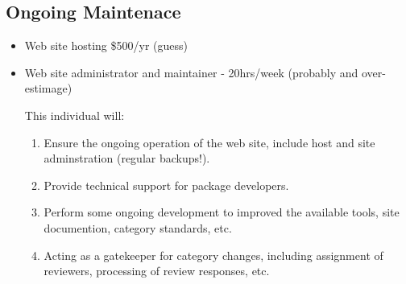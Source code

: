 \documentclass[12pt]{article}
\begin{document}
\subsection{Ongoing Maintenace}

\begin{itemize}

\item Web site hosting \$500/yr  (guess)

\item Web site administrator and maintainer - 20hrs/week (probably and
  over-estimage)

  This individual will:
  
  \begin{enumerate}

  \item Ensure the ongoing operation of the web site, include host and
    site adminstration (regular backups!).

  \item Provide technical support for package developers.
  
  \item Perform some ongoing development to improved the available
    tools, site documention, category standards, etc.
  
  \item Acting as a gatekeeper for category changes, including
    assignment of reviewers, processing of review responses, etc.

  \end{enumerate}

\end{itemize}
\end{document}
